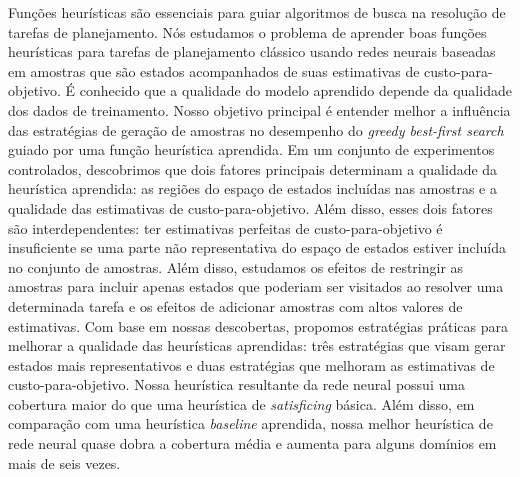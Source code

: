\begin{translatedabstract}
Funções heurísticas são essenciais para guiar algoritmos de busca na resolução de tarefas de planejamento.
Nós estudamos o problema de aprender boas funções heurísticas para tarefas de planejamento clássico usando redes neurais baseadas em amostras que são estados acompanhados de suas estimativas de custo-para-objetivo. É conhecido que a qualidade do modelo aprendido depende da qualidade dos dados de treinamento. Nosso objetivo principal é entender melhor a influência das estratégias de geração de amostras no desempenho do \emph{greedy best-first search} guiado por uma função heurística aprendida.
Em um conjunto de experimentos controlados, descobrimos que dois fatores principais determinam a qualidade da heurística aprendida: as regiões do espaço de estados incluídas nas amostras e a qualidade das estimativas de custo-para-objetivo. Além disso, esses dois fatores são interdependentes: ter estimativas perfeitas de custo-para-objetivo é insuficiente se uma parte não representativa do espaço de estados estiver incluída no conjunto de amostras.
Além disso, estudamos os efeitos de restringir as amostras para incluir apenas estados que poderiam ser visitados ao resolver uma determinada tarefa e os efeitos de adicionar amostras com altos valores de estimativas.
Com base em nossas descobertas, propomos estratégias práticas para melhorar a qualidade das heurísticas aprendidas: três estratégias que visam gerar estados mais representativos e duas estratégias que melhoram as estimativas de custo-para-objetivo.
Nossa heurística resultante da rede neural possui uma cobertura maior do que uma heurística de \emph{satisficing} básica. Além disso, em comparação com uma heurística \emph{baseline} aprendida, nossa melhor heurística de rede neural quase dobra a cobertura média e aumenta para alguns domínios em mais de seis vezes.
\end{translatedabstract}
